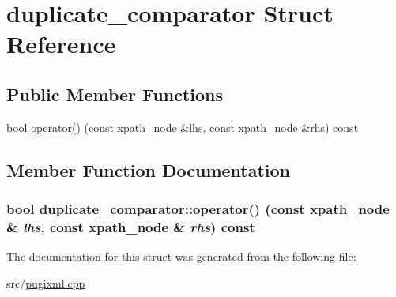 \hypertarget{structduplicate__comparator}{
\section{duplicate\_\-comparator Struct Reference}
\label{structduplicate__comparator}
}
\subsection*{Public Member Functions}
\begin{DoxyCompactItemize}
\item 
bool \hyperlink{structduplicate__comparator_afa36b2cf7af3e0bc7e41b03995bd99d3}{operator()} (const xpath\_\-node \&lhs, const xpath\_\-node \&rhs) const 
\end{DoxyCompactItemize}


\subsection{Member Function Documentation}
\hypertarget{structduplicate__comparator_afa36b2cf7af3e0bc7e41b03995bd99d3}{
\subsubsection[{operator()}]{\setlength{\rightskip}{0pt plus 5cm}bool duplicate\_\-comparator::operator() (const xpath\_\-node \& {\em lhs}, \/  const xpath\_\-node \& {\em rhs}) const}}
\label{structduplicate__comparator_afa36b2cf7af3e0bc7e41b03995bd99d3}


The documentation for this struct was generated from the following file:\begin{DoxyCompactItemize}
\item 
src/\hyperlink{pugixml_8cpp}{pugixml.cpp}\end{DoxyCompactItemize}
